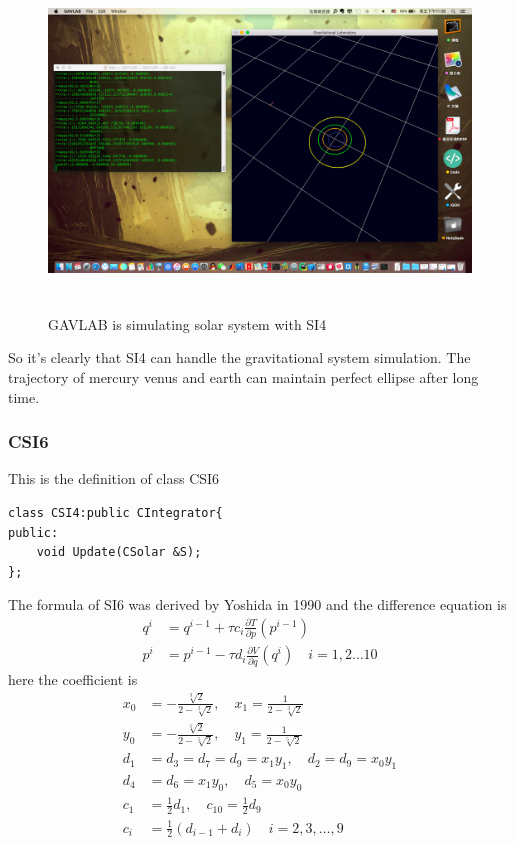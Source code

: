 \documentclass[12pt]{article}
\begin{document}
\begin{figure}[H]
\centering
\includegraphics[width=14.4cm,height=9cm]{SI4.png}
\caption{GAVLAB is simulating solar system with SI4}
\end{figure}

So it's clearly that SI4 can handle the gravitational system simulation.
The trajectory of mercury venus and earth can maintain perfect ellipse after long time.

\clearpage
\subsubsection{CSI6}
This is the definition of class CSI6
\begin{lstlisting}[caption=CSI6 class]
class CSI4:public CIntegrator{
public:
    void Update(CSolar &S);
};
\end{lstlisting}

The formula of SI6 was derived by Yoshida\cite{SI6} in 1990 and the difference equation is
\begin{equation}
\begin{aligned}
q^i &= q^{i-1} + \tau c_{i} \frac{\partial T}{\partial p}\left(p^{i-1} \right) \\
p^i &= p^{i-1} - \tau d_{i} \frac{\partial V}{\partial q}\left(q^{i} \right) \quad i=1,2\dots 10
\end{aligned}
\end{equation}
here the coefficient is
\[
\begin{aligned}
x_{0}&=-\frac{\sqrt[3]{2}}{2-\sqrt[3]{2}},\quad x_{1}=\frac{1}{2-\sqrt[3]{2}}\\
y_{0}&=-\frac{\sqrt[5]{2}}{2-\sqrt[5]{2}},\quad y_{1}=\frac{1}{2-\sqrt[5]{2}}\\
d_{1}&=d_{3}=d_{7}=d_{9}=x_{1}y_{1},\quad d_{2}=d_{9}=x_{0}y_{1}\\
d_{4}&=d_{6}=x_{1}y_{0},\quad d_{5}=x_{0}y_{0}\\
c_{1}&=\frac{1}{2}d_{1},\quad c_{10}=\frac{1}{2}d_{9}\\
c_{i}&=\frac{1}{2}\left(d_{i-1}+d_{i} \right)\quad i=2,3,\dots,9
\end{aligned}
\]
\end{document}
